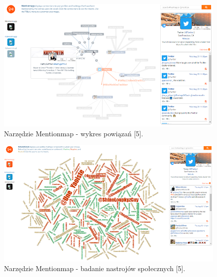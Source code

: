 





\begin{figure}[h] %
	\centering
	\includegraphics[width=1.0\linewidth]{img/twitter_tool_mentionmap}
	\caption{Narzędzie Mentionmap - wykres powiązań [5].}
\end{figure}

\begin{figure}[h] %
	\centering
	\includegraphics[width=1.0\linewidth]{img/twitter_tool_mentionmap_sentiment}
	\caption{Narzędzie Mentionmap - badanie nastrojów społecznych [5].}
\end{figure}